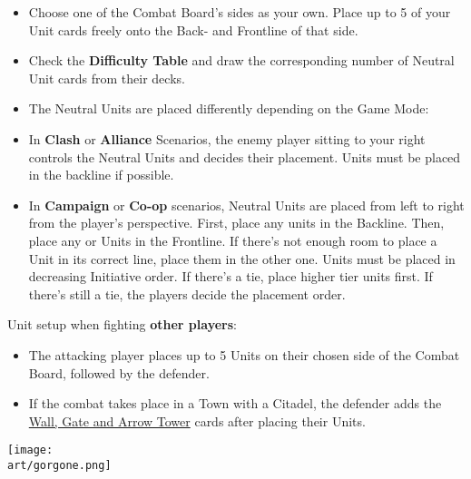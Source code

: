 \begin{multicols*}{2}
\begin{itemize}
  \item Choose one of the Combat Board's sides as your own.
    Place up to 5 of your Unit cards freely onto the Back- and Frontline of that side.
  \item Check the \textbf{Difficulty Table} and draw the corresponding number of Neutral Unit cards from their decks.
  \item The Neutral Units are placed differently depending on the Game Mode:
  \item In \textbf{Clash} or \textbf{Alliance} Scenarios, the enemy player sitting to your right controls the Neutral Units and decides their placement.
     Units must be placed in the backline if possible.
  \item In \textbf{Campaign} or \textbf{Co-op} scenarios, Neutral Units are placed from left to right from the player's perspective.
First, place any  units in the Backline.
Then, place any  or  Units in the Frontline.
If there's not enough room to place a Unit in its correct line, place them in the other one.
Units must be placed in decreasing Initiative order.
If there's a tie, place higher tier units first.
If there's still a tie, the players decide the placement order.
\end{itemize}
Unit setup when fighting \textbf{other players}:
\begin{itemize}[wide]
  \item The attacking player places up to 5 Units on their chosen side of the Combat Board, followed by the defender.
  \item If the combat takes place in a Town with a Citadel, the defender adds the \hyperlink{Walls}{Wall, Gate and Arrow Tower} cards after placing their Units.
\end{itemize}


\vspace*{\fill}
\hspace{6.6em}
\texttt{[image: \\art/gorgone.png]}

\vspace*{\fill}


\end{multicols*}
